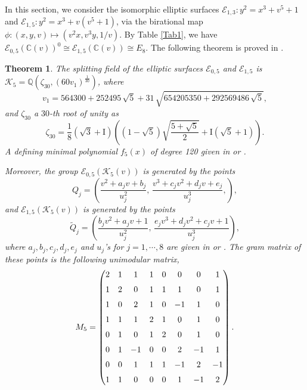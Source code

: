 \documentclass[11pt]{amsart}
\newcommand{\Q}{{\mathbb Q}}
\newcommand{\CC}{{\mathbb C}}
\newcommand{\Ee}{{\mathcal E}}
\newcommand{\KK}{{\mathcal K}}
\newtheorem{thm}{Theorem}[section]
\numberwithin{equation}{section}
\numberwithin{table}{section}
\newcommand\iso{\cong}
\newcommand\<{\langle}
\begin{document}
In this section, we  consider the isomorphic  elliptic surfaces   $\Ee_{1, 3}: y^2=x^3+ v^5+1$
and  $\Ee_{1, 5}: y^2=x^3+   v (v^5+1)$, via the birational map 
$\phi: (x,y,v) \mapsto (v^2 x, v^3 y, 1/v)$.
By Table \ref{Tab1}, we have   $\Ee_{0, 5}(\CC(v))^0\iso \Ee_{1,5}(\CC(v))\iso E_8$.
The following theorem is proved in  \cite[Theorem 1.3]{SS-Shz-2025}.
\begin{thm}
	\label{main2}
	The splitting field  of the elliptic  surfaces  $\Ee_{0,5}$  and $\Ee_{1,5}$	is 
	$\KK_5 = \Q \left(\zeta_{30}, (60 v_1)^{\frac{1}{30}}\right)$, where
	$$ v_1=564300+252495\,\sqrt {5}+31\,\sqrt {654205350+292569486\,\sqrt {5}},$$ 
	and $\zeta_{30}$ a $30$-th root of unity as 
	$$	\zeta_{30}=\frac{1}{8}\left(\sqrt{3}+\mathrm{I}\right) \left( \left(1-  \sqrt{5}\right) \sqrt{\frac{5+  \sqrt{5}}{2}}+\mathrm{I} \left(\sqrt{5}+1\right)\right).$$
	A defining minimal polynomial $f_5(x)$ of degree 120 given in \cite[minpols]{Shioda-Codes} or \cite[Gp-360]{Shioda360-Codes}.
	
	Moreover,  the   group $\Ee_{0, 5}(\KK_5(v))$ is generated by the points
	$$Q_j=\left( \frac{ v^2 + a_j v +b_j}{u_j^2}, \, \frac{v^3 +c_j v^2 + d_j v +e_j}{u_j^3},\right),  $$
	and   $\Ee_{1, 5}(\KK_5(v))$ is generated by the points
	$$\tilde{Q}_j=\left( \frac{ b_j v^2 + a_j v +1}{u_j^2}, \,
	\frac{e_j v^3 +d_j v^2 + c_j v +1}{u_j^3} \right),$$ 
	where  $a_j, b_j, c_j, d_j, e_j$  and  $u_j$'s for $j=1,\cdots, 8$  are given in 	\cite[Points-5]{Shioda-Codes} or \cite[Points-5]{Shioda360-Codes}.	
	The   gram matrix of these points is the following unimodular matrix,
	\begin{equation}
		M_5 =
		\begin{pmatrix}
			\label{m5}
			2 & 1 & 1 & 1 & 0 & 0 & 0 & 1 
			\\ \noalign{\medskip}
			1 & 2 & 0 & 1 & 1 & 1 & 0 & 1 
			\\ \noalign{\medskip}
			1 & 0 & 2 & 1 & 0 & -1 & 1 & 0 
			\\ \noalign{\medskip}
			1 & 1 & 1 & 2 & 1 & 0 & 1 & 0 
			\\ \noalign{\medskip}
			0 & 1 & 0 & 1 & 2 & 0 & 1 & 0 
			\\ \noalign{\medskip}
			0 & 1 & -1 & 0 & 0 & 2 & -1 & 1 
			\\ \noalign{\medskip}
			0 & 0 & 1 & 1 & 1 & -1 & 2 & -1 
			\\ \noalign{\medskip}
			1 & 1 & 0 & 0 & 0 & 1 & -1 & 2 	
		\end{pmatrix}.
	\end{equation}
\end{thm}
\end{document}
